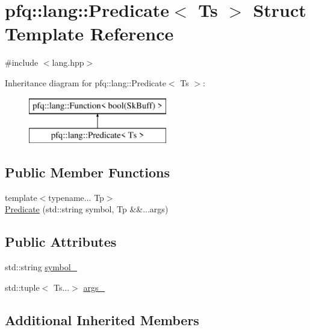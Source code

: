 \hypertarget{structpfq_1_1lang_1_1Predicate}{\section{pfq\+:\+:lang\+:\+:Predicate$<$ Ts $>$ Struct Template Reference}
\label{structpfq_1_1lang_1_1Predicate}
}


{\ttfamily \#include $<$lang.\+hpp$>$}

Inheritance diagram for pfq\+:\+:lang\+:\+:Predicate$<$ Ts $>$\+:\begin{figure}[H]
\begin{center}
\leavevmode
\includegraphics[height=2.000000cm]{structpfq_1_1lang_1_1Predicate}
\end{center}
\end{figure}
\subsection*{Public Member Functions}
\begin{DoxyCompactItemize}
\item 
{\footnotesize template$<$typename... Tp$>$ }\\\hyperlink{structpfq_1_1lang_1_1Predicate_ad604e102c7599051e801d790cca70591}{Predicate} (std\+::string symbol, Tp \&\&...args)
\end{DoxyCompactItemize}
\subsection*{Public Attributes}
\begin{DoxyCompactItemize}
\item 
std\+::string \hyperlink{structpfq_1_1lang_1_1Predicate_a5f3219d34d216f1af9f6b1cafb93cc62}{symbol\+\_\+}
\item 
std\+::tuple$<$ Ts...$>$ \hyperlink{structpfq_1_1lang_1_1Predicate_aee302feb9cdf55566e50249e6dcd50af}{args\+\_\+}
\end{DoxyCompactItemize}
\subsection*{Additional Inherited Members}


